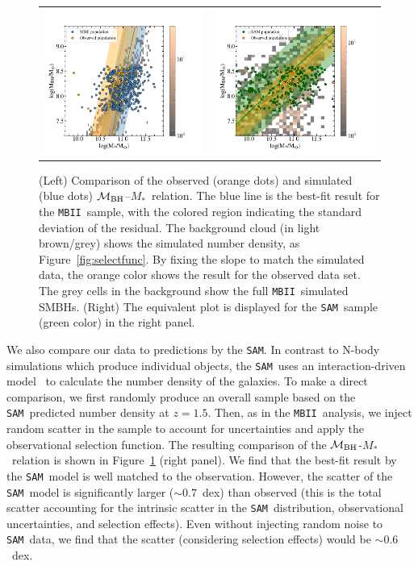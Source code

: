 \documentclass[twocolumn,trackchanges]{aastex63}
\newcommand{\mbh}{$\mathcal M_{\rm BH}$}
\newcommand{\mstar}{{$M_*$}}
\newcommand{\sam}{\texttt{SAM}}
\newcommand{\mbii}{\texttt{MBII}}
\begin{document}
\begin{figure}[t]%
\begin{tabular}{c c}
\includegraphics[trim = 0mm 0mm 65mm 0mm, clip, width=0.47\linewidth]{MBII_MM.png} &
\includegraphics[trim = 0mm 0mm 65mm 0mm, clip, width=0.47\linewidth]{SAM_MM_consider_nois.png} \\
\end{tabular}
\caption{(Left) Comparison of the observed (orange dots) and simulated (blue dots) \mbh--\mstar\ relation. The blue line is the best-fit result for the \mbii\ sample, with the colored region indicating the standard deviation of the residual. The background cloud (in light brown/grey) shows the simulated number density, as Figure~\ref{fig:selectfunc}. By fixing the slope to match the simulated data, the orange color shows the result for the observed data set. The grey cells in the background show the full \mbii\ simulated SMBHs. (Right) The equivalent plot is displayed for the \sam\ sample (green color) in the right panel.}
\label{fig:MM_comp}
\end{figure}

We also compare our data to predictions by the \sam. In contrast to N-body simulations which produce individual objects, the \sam\ uses an interaction-driven model~\citep{Menci2014} to calculate the number density of the galaxies. To make a direct comparison, we first randomly produce an overall sample based on the \sam\ predicted number density at $z=1.5$. Then, as in the \mbii\ analysis, we inject random scatter in the sample to account for uncertainties and apply the observational selection function. The resulting comparison of the  \mbh-\mstar\ relation is shown in Figure~\ref{fig:MM_comp} (right panel). We find that the best-fit result by the \sam\ model is well matched to the observation. However, the scatter of the \sam\ model is significantly larger ($\sim0.7$~dex) than observed (this is the total scatter accounting for the intrinsic scatter in the \sam\ distribution, observational uncertainties, and selection effects). Even without injecting random noise to \sam\ data, we find that the scatter (considering selection effects) would be $\sim0.6$~dex.
\end{document}
